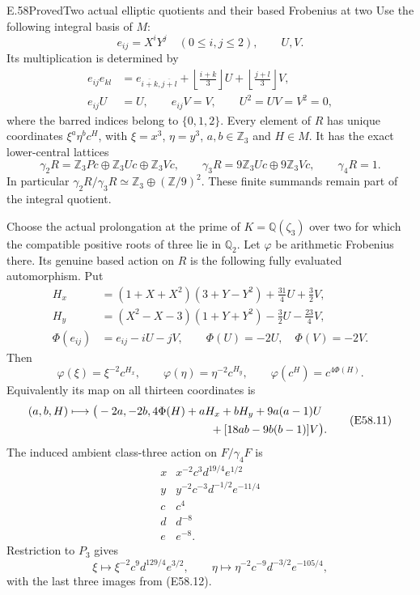 \begin{statement}{E.58}{Proved}{Two actual elliptic quotients and their based Frobenius at two}
Use the following integral basis of $M$:
\[
 e_{ij}=X^iY^j\quad(0\le i,j\le2),\qquad U,V.
 \tag{E58.6}
\]
Its multiplication is determined by
\[
 \begin{split}
 e_{ij}e_{kl}
   &=e_{\overline{i+k},\overline{j+l}}
         +\left\lfloor\frac{i+k}{3}\right\rfloor U
         +\left\lfloor\frac{j+l}{3}\right\rfloor V,\\
 e_{ij}U&=U,\qquad e_{ij}V=V,
 \qquad U^2=UV=V^2=0,
 \end{split}
 \tag{E58.7}
\]
where the barred indices belong to $\{0,1,2\}$.
Every element of $R$ has unique coordinates
$\xi^a\eta^b c^H$, with
$\xi=x^3$, $\eta=y^3$, $a,b\in\mathbb Z_3$ and $H\in M$.
It has the exact lower-central lattices
\[
 \gamma_2R=\mathbb Z_3Pc\oplus\mathbb Z_3Uc\oplus\mathbb Z_3Vc,
 \qquad
 \gamma_3R=9\mathbb Z_3Uc\oplus9\mathbb Z_3Vc,
 \qquad\gamma_4R=1.
 \tag{E58.8}
\]
In particular $\gamma_2R/\gamma_3R\simeq
\mathbb Z_3\oplus(\mathbb Z/9)^2$. These finite summands remain
part of the integral quotient.

Choose the actual prolongation at the prime of
$K=\mathbb Q(\zeta_3)$ over two for which the compatible positive
roots of three lie in $\mathbb Q_2$. Let $\varphi$ be arithmetic
Frobenius there. Its genuine based action on $R$ is the following
fully evaluated automorphism. Put
\[
 \begin{split}
 H_x&=(1+X+X^2)(3+Y-Y^2)+\frac{31}{4}U+\frac32V,\\
 H_y&=(X^2-X-3)(1+Y+Y^2)-\frac32U-\frac{23}{4}V,\\
 \Phi(e_{ij})&=e_{ij}-iU-jV,
       \qquad\Phi(U)=-2U,\quad\Phi(V)=-2V.
 \end{split}
 \tag{E58.9}
\]
Then
\[
 \varphi(\xi)=\xi^{-2}c^{H_x},\qquad
 \varphi(\eta)=\eta^{-2}c^{H_y},\qquad
 \varphi(c^H)=c^{4\Phi(H)}.
 \tag{E58.10}
\]
Equivalently its map on all thirteen coordinates is
\[
 \begin{split}
 (a,b,H)\longmapsto\bigl(&-2a,-2b,
    4\Phi(H)+aH_x+bH_y+9a(a-1)U\\
    &\hspace{35mm}+[18ab-9b(b-1)]V\bigr).
 \end{split}
 \tag{E58.11}
\]
The induced ambient class-three action on $F/\gamma_4F$ is
\[
 \begin{array}{c|l}
 x&x^{-2}c^3d^{19/4}e^{1/2}\\
 y&y^{-2}c^{-3}d^{-1/2}e^{-11/4}\\
 c&c^4\\
 d&d^{-8}\\
 e&e^{-8}.
 \end{array}
 \tag{E58.12}
\]
Restriction to $P_3$ gives
\[
 \xi\longmapsto\xi^{-2}c^9d^{129/4}e^{3/2},\qquad
 \eta\longmapsto\eta^{-2}c^{-9}d^{-3/2}e^{-105/4},
 \tag{E58.13}
\]
with the last three images from (E58.12).


\end{statement}
